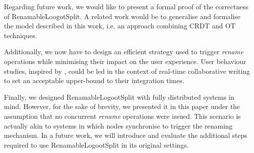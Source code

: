 \documentclass[sigplan,10pt,authorversion]{acmart}
\begin{document}
Regarding future work, we would like to present a formal proof of the correctness of RenamableLoogotSplit.
A related work would be to generalise and formalise the model described in this work, i.e. an approach combining \ac{CRDT} and OT techniques.

Additionally, we now have to design an efficient strategy used to trigger \emph{rename} operations while minimising their impact on the user experience.
User behaviour studies, inspired by \cite{ignat:hal-01088815,ignat:hal-01238831}, could be led in the context of real-time collaborative writing to set an acceptable upper-bound to their integration times.

Finally, we designed RenamableLogootSplit with fully distributed systems in mind.
However, for the sake of brevity, we presented it in this paper under the assumption that no concurrent \emph{rename} operations were issued.
This scenario is actually akin to systems in which nodes synchronise to trigger the renaming mechanism.
In a future work, we will introduce and evaluate the additional steps required to use RenamableLogootSplit in its original settings.


\end{document}

